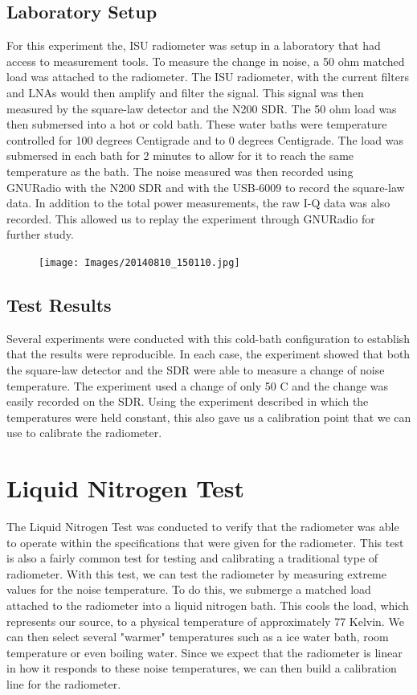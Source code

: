 \subsection{Laboratory Setup}
For this experiment the, ISU radiometer was setup in a laboratory that had access to measurement tools.  To measure the change in noise, a 50 ohm matched load was attached to the radiometer.  The ISU radiometer, with the current filters and LNAs would then amplify and filter the signal.  This signal was then measured by the square-law detector and the N200 SDR.  The 50 ohm load was then submersed into a hot or cold bath.  These water baths were temperature controlled for 100 degrees Centigrade and to 0 degrees Centigrade.  The load was submersed in each bath for 2 minutes to allow for it to reach the same temperature as the bath.  The noise measured was then recorded using GNURadio with the N200 SDR and with the USB-6009 to record the square-law data.  In addition to the total power measurements, the raw I-Q data was also recorded.  This allowed us to replay the experiment through GNURadio for further study.

\begin{figure}[h!tb] \centering

\texttt{[image: Images/20140810\_150110.jpg]}

\label{LabSetup}
\end{figure}

\subsection{Test Results}

Several experiments were conducted with this cold-bath configuration to establish that the results were reproducible.  In each case, the experiment showed that both the square-law detector and the SDR were able to measure a change of noise temperature.  The experiment used a change of only 50 C and the change was easily recorded on the SDR.  Using the experiment described in which the temperatures were held constant, this also gave us a calibration point that we can use to calibrate the radiometer.

\section{Liquid Nitrogen Test}
The Liquid Nitrogen Test was conducted to verify that the radiometer was able to operate within the specifications that were given for the radiometer.  This test is also a fairly common test for testing and calibrating a traditional type of radiometer.  With this test, we can test the radiometer by measuring extreme values for the noise temperature.  To do this, we submerge a matched load attached to the radiometer into a liquid nitrogen bath.  This cools the load, which represents our source, to a physical temperature of approximately 77 Kelvin.  We can then select several "warmer" temperatures such as a ice water bath, room temperature or even boiling water.  Since we expect that the radiometer is linear in how it responds to these noise temperatures, we can then build a calibration line for the radiometer.

